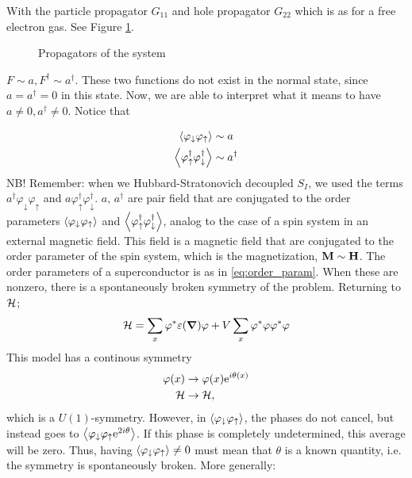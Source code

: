 With the particle propagator $G_{11}$ and hole propagator $G_{22}$ which is as for a free electron gas. See Figure \ref{fig:propagators}.
\begin{figure}
	\centering
	
	\caption{Propagators of the system}
	\label{fig:propagators}
\end{figure}
$F\sim a, F^\dagger \sim a^\dagger $.
These two functions do not exist in the normal state, since $a = a^\dagger = 0$ in this state. Now, we are able to interpret what it means to have $a \ne 0, a^\dagger \ne 0$.
Notice that 

\begin{align}
\label{eq:order_param}
\begin{split}
\ev{\varphi_\downarrow\varphi_\uparrow} &\sim a\\
\ev{\varphi_\uparrow^\dagger\varphi_\downarrow^\dagger} &\sim a^\dagger
\end{split}
\end{align}
NB! Remember: when we Hubbard-Stratonovich decoupled $S_I$, we used the terms $a^\dagger \varphi_\downarrow\varphi_\uparrow$ and $a\varphi_\uparrow^\dagger\varphi_\downarrow^\dagger$. $a,\, a^\dagger$ are pair field that are conjugated to the order parameters $\ev{\varphi_\downarrow\varphi_\uparrow}$ and $\ev{\varphi_\uparrow^\dagger\varphi_\downarrow^\dagger}$, analog to the case of a spin system in an external magnetic field. This field is a magnetic field that are conjugated to the order parameter of the spin system, which is the magnetization, $\vb{M} \sim \vb{H}$.
The order parameters of a superconductor is as in \eqref{eq:order_param}. When these are nonzero, there is a spontaneously broken symmetry of the problem. 
Returning to $\mathcal{H}$;
\begin{equation}
	\mathcal{H} = \sum_x\varphi^*\varepsilon(\grad)\varphi + V\sum_x\varphi^*\varphi\varphi^*\varphi
\end{equation}
This model has a continous symmetry
\begin{align*}
	\varphi(x) &\rightarrow \varphi(x)\mathrm{e}^{i\theta(x)} \\
	\mathcal{H} &\rightarrow \mathcal{H},
\end{align*}
 which is a $U(1)$-symmetry. However, in $\ev{\varphi_\downarrow\varphi_\uparrow}$, the phases do not cancel, but instead goes to $\ev{\varphi_\downarrow\varphi_\uparrow\e^{2i\theta}}$. If this phase is completely undetermined, this average will be zero. Thus, having $\ev{\varphi_\downarrow\varphi_\uparrow}\ne 0$ must mean that $\theta$ is a known quantity, i.e. the symmetry is spontaneously broken. 
 More generally:
 

